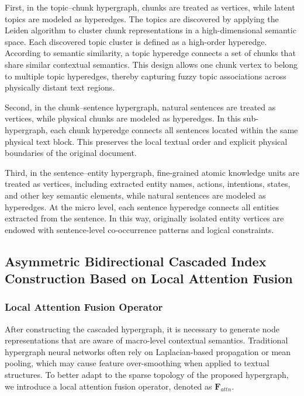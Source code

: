 \documentclass[preprint,12pt]{elsarticle}
\begin{document}
First, in the topic--chunk hypergraph, chunks are treated as vertices, while latent topics are modeled as hyperedges. The topics are discovered by applying the Leiden algorithm to cluster chunk representations in a high-dimensional semantic space. Each discovered topic cluster is defined as a high-order hyperedge. According to semantic similarity, a topic hyperedge connects a set of chunks that share similar contextual semantics. This design allows one chunk vertex to belong to multiple topic hyperedges, thereby capturing fuzzy topic associations across physically distant text regions.

Second, in the chunk--sentence hypergraph, natural sentences are treated as vertices, while physical chunks are modeled as hyperedges. In this sub-hypergraph, each chunk hyperedge connects all sentences located within the same physical text block. This preserves the local textual order and explicit physical boundaries of the original document.

Third, in the sentence--entity hypergraph, fine-grained atomic knowledge units are treated as vertices, including extracted entity names, actions, intentions, states, and other key semantic elements, while natural sentences are modeled as hyperedges. At the micro level, each sentence hyperedge connects all entities extracted from the sentence. In this way, originally isolated entity vertices are endowed with sentence-level co-occurrence patterns and logical constraints.

\subsection{Asymmetric Bidirectional Cascaded Index Construction Based on Local Attention Fusion}

\subsubsection{Local Attention Fusion Operator}

After constructing the cascaded hypergraph, it is necessary to generate node representations that are aware of macro-level contextual semantics. Traditional hypergraph neural networks often rely on Laplacian-based propagation or mean pooling, which may cause feature over-smoothing when applied to textual structures. To better adapt to the sparse topology of the proposed hypergraph, we introduce a local attention fusion operator, denoted as $\mathbf{F}_{attn}$.
\end{document}
